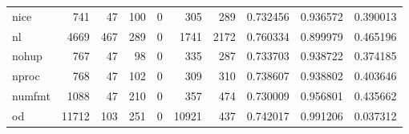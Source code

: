 \begin{longtable}{lrrrrrrrrr}
nice      &                                                741 &                                                 47 &                                                100 &                                                  0 &                                                305 &                                                289 &                                           0.732456 &                               0.936572 &                             0.390013 \\
nl        &                                               4669 &                                                467 &                                                289 &                                                  0 &                                               1741 &                                               2172 &                                           0.760334 &                               0.899979 &                             0.465196 \\
nohup     &                                                767 &                                                 47 &                                                 98 &                                                  0 &                                                335 &                                                287 &                                           0.733703 &                               0.938722 &                             0.374185 \\
nproc     &                                                768 &                                                 47 &                                                102 &                                                  0 &                                                309 &                                                310 &                                           0.738607 &                               0.938802 &                             0.403646 \\
numfmt    &                                               1088 &                                                 47 &                                                210 &                                                  0 &                                                357 &                                                474 &                                           0.730009 &                               0.956801 &                             0.435662 \\
od        &                                              11712 &                                                103 &                                                251 &                                                  0 &                                              10921 &                                                437 &                                           0.742017 &                               0.991206 &                             0.037312 \\

\end{longtable}
